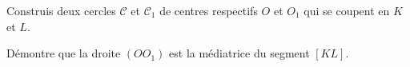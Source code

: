 \begin{myenumerate}
  \item Construis deux cercles $\mathscr{C}$ et $\mathscr{C}_1$ de centres respectifs $O$ et $O_1$ qui se coupent en $K$ et $L$.
  \item Démontre que la droite $(OO_1)$ est la médiatrice du segment $[KL]$.
\end{myenumerate}